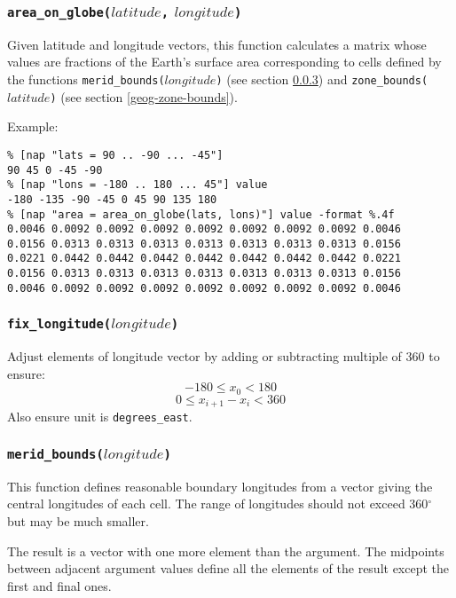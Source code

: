 \subsubsection{\texttt{area\_on\_globe(}$latitude$\texttt{,} $longitude$\texttt{)}}
    \label{geog-area-on-globe}

Given latitude and longitude vectors, this function calculates a
  matrix whose values are fractions of the Earth's surface area
  corresponding to cells defined by the functions 
\texttt{merid\_bounds(}$longitude$\texttt{)}
(see section \ref{geog-merid-bounds})
and 
\texttt{zone\_bounds(}$latitude$\texttt{)}
(see section \ref{geog-zone-bounds}).
  
 Example:
  \begin{verbatim}
% [nap "lats = 90 .. -90 ... -45"]
90 45 0 -45 -90
% [nap "lons = -180 .. 180 ... 45"] value
-180 -135 -90 -45 0 45 90 135 180
% [nap "area = area_on_globe(lats, lons)"] value -format %.4f
0.0046 0.0092 0.0092 0.0092 0.0092 0.0092 0.0092 0.0092 0.0046
0.0156 0.0313 0.0313 0.0313 0.0313 0.0313 0.0313 0.0313 0.0156
0.0221 0.0442 0.0442 0.0442 0.0442 0.0442 0.0442 0.0442 0.0221
0.0156 0.0313 0.0313 0.0313 0.0313 0.0313 0.0313 0.0313 0.0156
0.0046 0.0092 0.0092 0.0092 0.0092 0.0092 0.0092 0.0092 0.0046
\end{verbatim}

\subsubsection{\texttt{fix\_longitude(}$longitude$\texttt{)}}
    \label{geog-fix-longitude}

Adjust elements of longitude vector by adding or subtracting
  multiple of 360 to ensure:
\[-180 \le x_{0} < 180\]
\[0 \le x_{i+1} - x_{i} < 360\]
Also ensure unit is \texttt{degrees\_east}.

\subsubsection{\texttt{merid\_bounds(}$longitude$\texttt{)}}
    \label{geog-merid-bounds}

This function defines reasonable boundary longitudes from a
  vector giving the central longitudes of each cell. The range of
  longitudes should not exceed 360$^{\circ}$ but may be much smaller.
  
 The result is a vector with one more element than the argument.
  The midpoints between adjacent argument values define all the
  elements of the result except the first and final ones.
  
